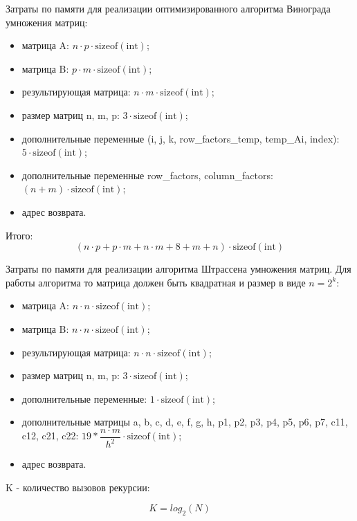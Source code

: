 Затраты по памяти для реализации оптимизированного алгоритма Винограда умножения матриц:
\begin{itemize}
	\item матрица A: $n \cdot p \cdot \text{sizeof}(\text{int})$;
	\item матрица B: $p \cdot m \cdot \text{sizeof}(\text{int})$;
	\item результирующая матрица: $n \cdot m \cdot \text{sizeof}(\text{int})$;
	\item размер матриц n, m, p: $3\cdot \text{sizeof}(\text{int})$;
	\item дополнительные переменные (i, j, k, row\_factors\_temp, temp\_Ai, index): $5\cdot \text{sizeof}(\text{int})$;
	\item дополнительные переменные row\_factors, column\_factors: $(n + m) \cdot\text{sizeof}(\text{int})$;
	\item адрес возврата.
\end{itemize}

Итого:
\begin{equation}
	\label{eq:optimized_alg}
	(n \cdot p + p \cdot m + n \cdot m + 8 + m + n) \cdot \text{sizeof}(\text{int})
\end{equation}

Затраты по памяти для реализации алгоритма Штрассена умножения матриц. Для работы алгоритма то матрица должен быть квадратная и размер в виде $n = 2^k$:
\begin{itemize}
	\item матрица A: $n \cdot n \cdot \text{sizeof}(\text{int})$;
	\item матрица B: $n \cdot n \cdot \text{sizeof}(\text{int})$;
	\item результирующая матрица: $n \cdot n \cdot \text{sizeof}(\text{int})$;
	\item размер матриц n, m, p: $3\cdot \text{sizeof}(\text{int})$;
	\item дополнительные переменные: $1\cdot \text{sizeof}(\text{int})$;
	\item дополнительные матрицы a, b, c, d, e, f, g, h, p1, p2, p3, p4, p5, p6, p7, c11, c12, c21, c22: $19 * \dfrac{n \cdot m }{{h}^2} \cdot\text{sizeof}(\text{int})$;
	\item адрес возврата.
\end{itemize}

K - количество вызовов рекурсии:

\begin{equation}
	K = log_2(N)
\end{equation}

